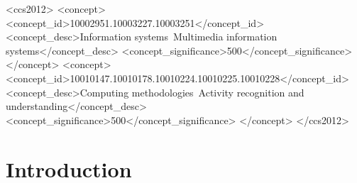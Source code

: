 \documentclass[sigconf,screen,review,anonymous]{acmart}
\begin{document}
\begin{CCSXML}
<ccs2012>
   <concept>
       <concept_id>10002951.10003227.10003251</concept_id>
       <concept_desc>Information systems~Multimedia information systems</concept_desc>
       <concept_significance>500</concept_significance>
       </concept>
   <concept>
       <concept_id>10010147.10010178.10010224.10010225.10010228</concept_id>
       <concept_desc>Computing methodologies~Activity recognition and understanding</concept_desc>
       <concept_significance>500</concept_significance>
       </concept>
 </ccs2012>
\end{CCSXML}


\maketitle



\section{Introduction}
\end{document}

